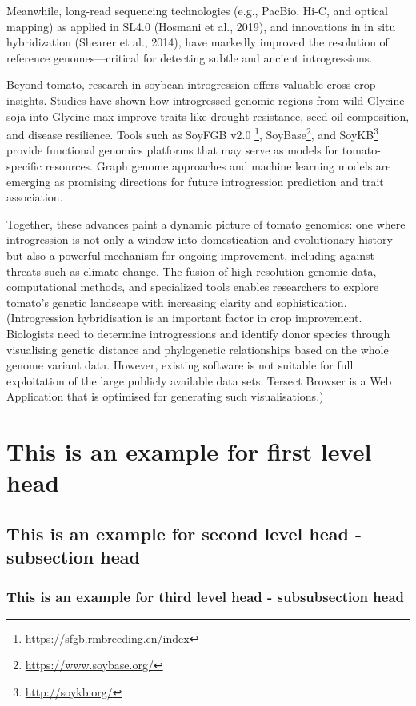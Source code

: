 \documentclass[unnumsec,webpdf,contemporary,large]{oup-authoring-template}%
\theoremstyle{thmstyleone}%
\theoremstyle{thmstyletwo}%
\theoremstyle{thmstylethree}%
\begin{document}
Meanwhile, long-read sequencing technologies (e.g., PacBio, Hi-C, and optical mapping) as applied in SL4.0 (Hosmani et al., 2019), and innovations in in situ hybridization (Shearer et al., 2014), have markedly improved the resolution of reference genomes—critical for detecting subtle and ancient introgressions. 

Beyond tomato, research in soybean introgression offers valuable cross-crop insights. Studies have shown how introgressed genomic regions from wild Glycine soja into Glycine max improve traits like drought resistance, seed oil composition, and disease resilience. Tools such as SoyFGB v2.0 \footnote{\url{https://sfgb.rmbreeding.cn/index}}, SoyBase\footnote{\url{https://www.soybase.org/}}, and SoyKB\footnote{\url{http://soykb.org/}} provide functional genomics platforms that may serve as models for tomato-specific resources. Graph genome approaches and machine learning models are emerging as promising directions for future introgression prediction and trait association.

Together, these advances paint a dynamic picture of tomato genomics: one where introgression is not only a window into domestication and evolutionary history but also a powerful mechanism for ongoing improvement, including against threats such as climate change. The fusion of high-resolution genomic data, computational methods, and specialized tools enables researchers to explore tomato’s genetic landscape with increasing clarity and sophistication.  
(Introgression hybridisation is an important factor in crop improvement. Biologists need to determine introgressions and identify donor species through visualising genetic distance and phylogenetic relationships based on the whole genome variant data. However, existing software is not suitable for full exploitation of the large publicly available data sets. Tersect Browser is a Web Application that is optimised for generating such visualisations.)

\section{This is an example for first level head}\label{sec3}

\subsection{This is an example for second level head - subsection head}\label{subsec2}

\subsubsection{This is an example for third level head - subsubsection head}\label{subsubsec2}
\end{document}
